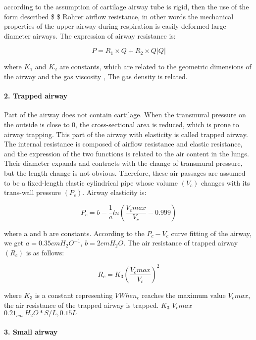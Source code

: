 \documentclass[
]{article}
\begin{document}
according to the assumption of cartilage airway tube is rigid, then the
use of the form described \$ \$ Rohrer airflow resistance, in other
words the mechanical properties of the upper airway during respiration
is easily deformed large diameter airways. The expression of airway
resistance is:

\[P=R _1 \times Q +R _2 \times Q|Q|\]

where \(K _1\) and \(K _2\) are constants, which are related to the
geometric dimensions of the airway and the gas viscosity , The gas
density is related.

\hypertarget{2-trapped-airway}{%
\paragraph{\texorpdfstring{2. Trapped airway
}{2. Trapped airway }}\label{2-trapped-airway}}

Part of the airway does not contain cartilage. When the transmural
pressure on the outside is close to 0, the cross-sectional area is
reduced, which is prone to airway trapping. This part of the airway with
elasticity is called trapped airway. The internal resistance is composed
of airflow resistance and elastic resistance, and the expression of the
two functions is related to the air content in the lungs. Their diameter
expands and contracts with the change of transmural pressure, but the
length change is not obvious. Therefore, these air passages are assumed
to be a fixed-length elastic cylindrical pipe whose volume \((V _c)\)
changes with its trans-wall pressure \((P _c)\). Airway elasticity is:

\[P _c=b-{\frac{1}{a}}ln(\frac{V _cmax}{V _c}-0.999)\]

where a and b are constants. According to the \(P _c-V _c\) curve
fitting of the airway, we get \(a = 0.35cm H _2O ^{-1}\),
\(b=2cm H _2O\). The air resistance of trapped airway \((R _c)\) is as
follows:

\[R _c = K _3(\frac{V _cmax}{V _c}) ^2\]

where \(K _3\) is a constant representing \(V When _c\) reaches the
maximum value \(V _cmax\), the air resistance of the trapped airway is
trapped. \(K _3\) \(V _cmax\) \(0.21 _{cm}~H_2O*S/L,0.15L\)

\hypertarget{3-small-airway}{%
\paragraph{\texorpdfstring{3. Small airway
}{3. Small airway }}\label{3-small-airway}}
\end{document}
